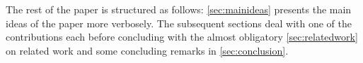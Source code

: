 The rest of the paper is structured as follows: \cref{sec:mainideas} presents the main ideas of the paper more verbosely. The subsequent sections deal with one of the contributions each before concluding with the almost obligatory \cref{sec:relatedwork} on related work and some concluding remarks in \cref{sec:conclusion}.
